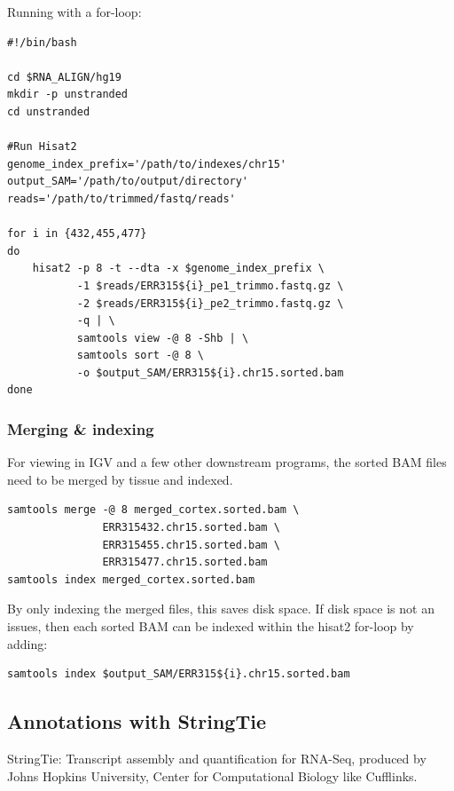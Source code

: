 Running with a for-loop:
\begin{verbatim}
#!/bin/bash

cd $RNA_ALIGN/hg19
mkdir -p unstranded
cd unstranded

#Run Hisat2
genome_index_prefix='/path/to/indexes/chr15'
output_SAM='/path/to/output/directory'
reads='/path/to/trimmed/fastq/reads'

for i in {432,455,477}
do
    hisat2 -p 8 -t --dta -x $genome_index_prefix \
           -1 $reads/ERR315${i}_pe1_trimmo.fastq.gz \
           -2 $reads/ERR315${i}_pe2_trimmo.fastq.gz \
           -q | \
           samtools view -@ 8 -Shb | \
           samtools sort -@ 8 \
           -o $output_SAM/ERR315${i}.chr15.sorted.bam
done
\end{verbatim}

\subsubsection*{Merging \& indexing}
For viewing in IGV and a few other downstream programs, the sorted BAM files need to be merged by tissue and indexed.

\begin{verbatim}
samtools merge -@ 8 merged_cortex.sorted.bam \
               ERR315432.chr15.sorted.bam \
               ERR315455.chr15.sorted.bam \
               ERR315477.chr15.sorted.bam
samtools index merged_cortex.sorted.bam
\end{verbatim}

By only indexing the merged files, this saves disk space. If disk space is not an issues, then each sorted BAM can be indexed within the hisat2 for-loop by adding:

\begin{verbatim}
samtools index $output_SAM/ERR315${i}.chr15.sorted.bam
\end{verbatim}

\subsection{Annotations with StringTie}
StringTie\cite{Pertea2015,Pertea2016}: Transcript assembly and quantification for RNA-Seq, produced by Johns Hopkins University, Center for Computational Biology like Cufflinks.

